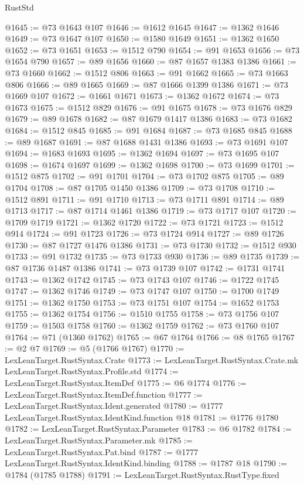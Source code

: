\begin{lexlean}{RustStd}
\begin{coremodule}
@1645 := @73 @1643 @107
@1646 := @1612 @1645
@1647 := @1362 @1646
@1649 := @73 @1647 @107
@1650 := @1580 @1649
@1651 := @1362 @1650
@1652 := @73 @1651
@1653 := @1512 @790
@1654 := @91 @1653
@1656 := @73 @1654 @790
@1657 := @89 @1656
@1660 := @87 @1657 @1383 @1386
@1661 := @73 @1660
@1662 := @1512 @806
@1663 := @91 @1662
@1665 := @73 @1663 @806
@1666 := @89 @1665
@1669 := @87 @1666 @1399 @1386
@1671 := @73 @1669 @107
@1672 := @1661 @1671
@1673 := @1362 @1672
@1674 := @73 @1673
@1675 := @1512 @829
@1676 := @91 @1675
@1678 := @73 @1676 @829
@1679 := @89 @1678
@1682 := @87 @1679 @1417 @1386
@1683 := @73 @1682
@1684 := @1512 @845
@1685 := @91 @1684
@1687 := @73 @1685 @845
@1688 := @89 @1687
@1691 := @87 @1688 @1431 @1386
@1693 := @73 @1691 @107
@1694 := @1683 @1693
@1695 := @1362 @1694
@1697 := @73 @1695 @107
@1698 := @1674 @1697
@1699 := @1362 @1698
@1700 := @73 @1699
@1701 := @1512 @875
@1702 := @91 @1701
@1704 := @73 @1702 @875
@1705 := @89 @1704
@1708 := @87 @1705 @1450 @1386
@1709 := @73 @1708
@1710 := @1512 @891
@1711 := @91 @1710
@1713 := @73 @1711 @891
@1714 := @89 @1713
@1717 := @87 @1714 @1461 @1386
@1719 := @73 @1717 @107
@1720 := @1709 @1719
@1721 := @1362 @1720
@1722 := @73 @1721
@1723 := @1512 @914
@1724 := @91 @1723
@1726 := @73 @1724 @914
@1727 := @89 @1726
@1730 := @87 @1727 @1476 @1386
@1731 := @73 @1730
@1732 := @1512 @930
@1733 := @91 @1732
@1735 := @73 @1733 @930
@1736 := @89 @1735
@1739 := @87 @1736 @1487 @1386
@1741 := @73 @1739 @107
@1742 := @1731 @1741
@1743 := @1362 @1742
@1745 := @73 @1743 @107
@1746 := @1722 @1745
@1747 := @1362 @1746
@1749 := @73 @1747 @107
@1750 := @1700 @1749
@1751 := @1362 @1750
@1753 := @73 @1751 @107
@1754 := @1652 @1753
@1755 := @1362 @1754
@1756 := @1510 @1755
@1758 := @73 @1756 @107
@1759 := @1503 @1758
@1760 := @1362 @1759
@1762 := @73 @1760 @107
@1764 := @71 (@1360 @1762)
@1765 := @67 @1764
@1766 := @8 @1765
@1767 := @2 @7
@1769 := @5 (@1766 @1767)
@1770 := LexLeanTarget.RustSyntax.Crate
@1773 := LexLeanTarget.RustSyntax.Crate.mk LexLeanTarget.RustSyntax.Profile.std
@1774 := LexLeanTarget.RustSyntax.ItemDef
@1775 := @6 @1774
@1776 := LexLeanTarget.RustSyntax.ItemDef.function
@1777 := LexLeanTarget.RustSyntax.Ident.generated
@1780 := @1777 LexLeanTarget.RustSyntax.IdentKind.function @18
@1781 := @1776 @1780
@1782 := LexLeanTarget.RustSyntax.Parameter
@1783 := @6 @1782
@1784 := LexLeanTarget.RustSyntax.Parameter.mk
@1785 := LexLeanTarget.RustSyntax.Pat.bind
@1787 := @1777 LexLeanTarget.RustSyntax.IdentKind.binding
@1788 := @1787 @18
@1790 := @1784 (@1785 @1788)
@1791 := LexLeanTarget.RustSyntax.RustType.fixed

\end{coremodule}
\end{lexlean}
